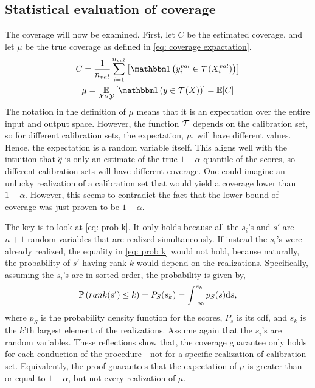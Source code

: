 \subsection*{Statistical evaluation of coverage}
The coverage will now be examined. First, let $C$ be the estimated coverage, and let $\mu$ be the true coverage as defined in \cref{eq: coverage expactation}.
%
\begin{gather}
\label{eq: coverage mu}
C = \frac{1}{n_{val}}\sum_{i=1}^{n_{val}}\left[\doubleOne\left(y^{val}_i\in\Tau(X^{val}_i)\right)\right]\\
\label{eq: coverage C}
\mu = \doubleE_{\X \times\Y}\left[\doubleOne\left(y\in\Tau(X)\right)\right]=\doubleE[C]
\end{gather}
%
The notation in the definition of $\mu$ means that it is an expectation over the entire input and output space. However, the function $\Tau$ depends on the calibration set, so for different calibration sets, the expectation, $\mu$, will have different values. Hence, the expectation is a random variable itself. This aligns well with the intuition that $\hat q$ is only an estimate of the true $1-\alpha$ quantile of the scores, so different calibration sets will have different coverage. One could imagine an unlucky realization of a calibration set that would yield a coverage lower than $1-\alpha$. However, this seems to contradict the fact that the lower bound of coverage was just proven to be $1-\alpha$.

The key is to look at \cref{eq: prob k}. It only holds because all the $s_i$'s and $s'$ are $n+1$ random variables that are realized simultaneously. If instead the $s_i$'s were already realized, the equality in \cref{eq: prob k} would not hold, because naturally, the probability of $s'$ having rank $k$ would depend on the realizations. Specifically, assuming the $s_i$'s are in sorted order, the probability is given by,
\begin{gather}
    \operatorname*{\mathbb{P}}\left(rank(s')\leq k\right) =
    P_S(s_k) = \int_{-\infty}^{s_{k}} p_S(s) \text{d} s ,
\end{gather}
where $p_S$ is the probability density function for the scores, $P_s$ is its cdf, and $s_k$ is the $k$'th largest element of the realizations. Assume again that the $s_i$'s are random variables. These reflections show that, the coverage guarantee only holds for each conduction of the procedure - not for a specific realization of calibration set. Equivalently, the proof guarantees that the expectation of $\mu$ is greater than or equal to $1-\alpha$, but not every realization of $\mu$.

